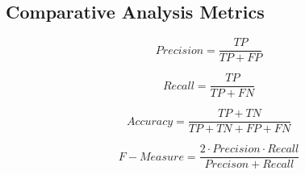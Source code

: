 \subsection{Comparative Analysis Metrics}

\begin{equation}
Precision = \frac{TP}{TP+FP}
\end{equation}

\begin{equation}
Recall = \frac{TP}{TP+FN}
\end{equation}

\begin{equation}
Accuracy = \frac{TP+TN}{TP+TN+FP+FN}
\end{equation}

\begin{equation}
F-Measure = \frac{2\cdot Precision\cdot Recall}{Precison+Recall}
\end{equation}




